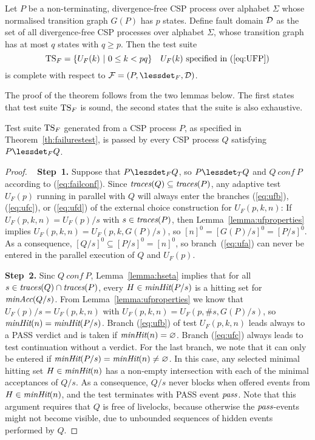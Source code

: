  
\begin{theorem}\label{th:failurestest}
Let $P$ be a non-terminating, divergence-free CSP process over alphabet $\Sigma$ whose
normalised transition graph $G(P)$ has $p$ states. Define fault domain ${\cal
D}$ as the set of all divergence-free CSP processes over alphabet $\Sigma$,
whose transition graph has at most $q$ states with $q \ge p$. Then the test
suite
\[
{\text{TS}}_F = \{ U_F(k)~|~0 \le k < pq  \}\quad\text{$U_F(k)$ specified in (\ref{eq:UFP})}
\]
is complete with respect to ${\cal F} = (P,\lessdet_F,{\cal D})$.
\end{theorem}
%
The proof of the theorem follows from the two lemmas below. The first states
that test suite ${\text{TS}}_F$ is sound, the second states that the suite is also
exhaustive.
%
\begin{lemma}\label{lemma:mainfsound}
Test suite ${\text{TS}}_F$ generated from a CSP process $P$, as specified in
Theorem~\ref{th:failurestest}, is passed by every CSP process $Q$ satisfying
$P\lessdet_F Q$.
\end{lemma}
\begin{proof}{~}\newline
{\bf Step~1.} Suppose that $P\lessdet_F Q$, so $P\lessdet_T Q$ and  $Q\ conf\
P$ according to (\ref{eq:failconf}). Since   $\text{\it traces}(Q)\subseteq \text{\it traces}(P)$,
any adaptive test $U_F(p)$ running in parallel with $Q$ will always enter the
branches (\ref{eq:ufb}), (\ref{eq:ufc}), or (\ref{eq:ufd}) of the external
choice construction for $U_F(p,k,n)$:  
If $U_F(p,k,n) = U_F(p)/s$ with $s\in\text{\it traces}(P)$, then Lemma~\ref{lemma:ufproperties}
implies $U_F(p,k,n) = U_F(p,k,G(P)/s)$, so $[n]^0 = [G(P)/s]^0 = [P/s]^0$. As
a consequence, $[Q/s]^0\subseteq [P/s]^0 = [n]^0$, so branch~(\ref{eq:ufa}) can never be
entered in the parallel execution of $Q$ and $U_F(p)$.

\medskip
\noindent
{\bf Step~2.} Sinc $Q\ conf\ P$, Lemma~\ref{lemma:hseta} implies that for all  
$s\in\text{\it traces}(Q)\cap\text{\it traces}(P)$, every $H \in \text{\it minHit}(P/s)$ is a hitting set for
$\text{\it minAcc}(Q/s)$. 
From Lemma~\ref{lemma:ufproperties} we know that
$U_F(p)/s = U_F(p,k,n)$ with $U_F(p,k,n) = U_F(p,\#s,G(P)/s)$, 
so $\text{\it minHit}(n) = \text{\it minHit}(P/s)$. 
Branch (\ref{eq:ufb}) of test $U_F(p,k,n)$ leads always to a
PASS verdict and is taken if $\text{\it minHit}(n) = \varnothing$. Branch (\ref{eq:ufc}) 
always leads to test continuation without a
verdict. For the last branch, we note that it can only be entered if $\text{\it minHit}(P/s)
= \text{\it minHit}(n) \neq\varnothing$. In this case,
any selected minimal hitting set
$H\in\text{\it minHit}(n)$ has a non-empty intersection with each of the minimal
acceptances of $Q/s$. 
As a consequence, $Q/s$ never blocks when offered
events from $H\in\text{\it minHit}(n)$, 
and the test terminates with PASS event ${\text{\it pass}}$. Note that
this argument requires that $Q$ is free of livelocks, because otherwise the
${\text{\it pass}}$-events might not become visible, due to unbounded sequences of
hidden events performed by $Q$. 
\xbox
\end{proof}
